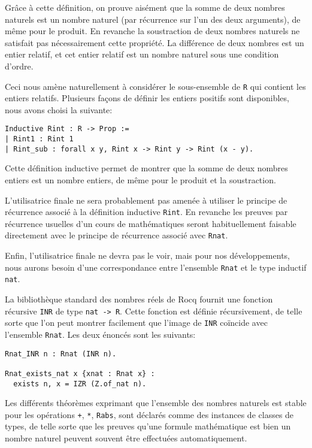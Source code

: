 \documentclass{modjflart}
\begin{document}
Grâce à cette définition, on prouve aisément que la somme de deux
nombres naturels est un nombre naturel (par récurrence sur l'un des
deux arguments), de même pour le produit.  En revanche la soustraction
de deux nombres naturels ne satisfait pas nécessairement cette
propriété.  La différence de deux nombres est un entier relatif, et
cet entier relatif est un nombre naturel sous une condition d'ordre.

Ceci nous amène naturellement à considérer le sous-ensemble de \texttt{R}
qui contient les entiers relatifs.  Plusieurs façons de définir les
entiers positifs sont disponibles, nous avons choisi la suivante:
\begin{verbatim}
Inductive Rint : R -> Prop :=
| Rint1 : Rint 1
| Rint_sub : forall x y, Rint x -> Rint y -> Rint (x - y).
\end{verbatim}
Cette définition inductive permet de montrer que la somme de deux
nombres entiers est un nombre entiers, de même pour le produit et
la soustraction.

L'utilisatrice finale ne sera probablement pas amenée à utiliser le
principe de récurrence associé à la définition inductive \texttt{Rint}.
En revanche les preuves par récurrence usuelles d'un cours de
mathématiques seront habituellement faisable directement avec le
principe de récurrence associé avec \texttt{Rnat}.

Enfin, l'utilisatrice finale ne devra pas le voir,
mais pour nos développements, nous aurons besoin d'une
correspondance entre l'ensemble \texttt{Rnat} et le type inductif
\texttt{nat}.

La bibliothèque standard des nombres réels de Rocq fournit une fonction
récursive \texttt{INR} de type \texttt{nat -> R}.  Cette fonction est
définie récursivement, de telle sorte que l'on peut montrer facilement
que l'image de \texttt{INR} coïncide avec l'ensemble \texttt{Rnat}.  Les
deux énoncés sont les suivants:
\begin{verbatim}
Rnat_INR n : Rnat (INR n).

Rnat_exists_nat x {xnat : Rnat x} :
  exists n, x = IZR (Z.of_nat n).
\end{verbatim}

Les différents théorèmes exprimant que l'ensemble des nombres naturels
est stable pour les opérations \texttt{+}, \texttt{*}, \texttt{Rabs},
sont déclarés comme des instances de classes de types, de telle sorte que
les preuves qu'une formule mathématique est bien un nombre naturel peuvent
souvent être effectuées automatiquement.
\end{document}
